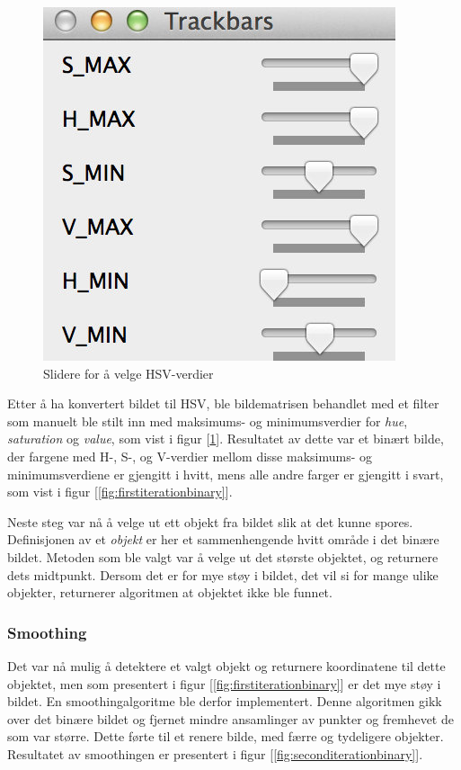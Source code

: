 \begin{figure}
	\includegraphics[width=\linewidth]{img/sliders.jpg}
	\caption{Slidere for å velge HSV-verdier}
	\label{fig:sliders}
\end{figure}

Etter å ha konvertert bildet til HSV, ble bildematrisen behandlet med et filter som manuelt ble stilt inn med maksimums- og minimumsverdier for \emph{hue}, \emph{saturation} og \emph{value}, som vist i figur [\ref{fig:sliders}]. Resultatet av dette var et binært bilde, der fargene med H-, S-, og V-verdier mellom disse maksimums- og minimumsverdiene er gjengitt i hvitt, mens alle andre farger er gjengitt i svart, som vist i figur [\ref{fig:firstiterationbinary}].

Neste steg var nå å velge ut ett objekt fra bildet slik at det kunne spores. Definisjonen av et \emph{objekt} er her et sammenhengende hvitt område i det binære bildet. Metoden som ble valgt var å velge ut det største objektet, og returnere dets midtpunkt. Dersom det er for mye støy i bildet, det vil si for mange ulike objekter, returnerer algoritmen at objektet ikke ble funnet.

\subsubsection{Smoothing}
Det var nå mulig å detektere et valgt objekt og returnere koordinatene til dette objektet, men som presentert i figur [\ref{fig:firstiterationbinary}] er det mye støy i bildet. En smoothingalgoritme ble derfor implementert. Denne algoritmen gikk over det binære bildet og fjernet mindre ansamlinger av punkter og fremhevet de som var større. Dette førte til et renere bilde, med færre og tydeligere objekter. Resultatet av smoothingen er presentert i figur [\ref{fig:seconditerationbinary}].


